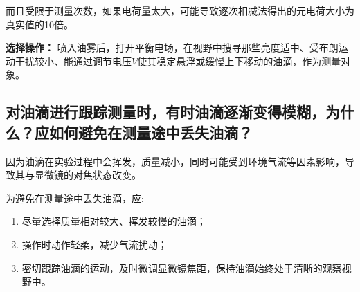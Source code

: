 \documentclass[yuxi]{../../templates/Report}%
\begin{document}
\begin{fullreportonly}
\begin{enumerate}
    而且受限于测量次数，如果电荷量太大，可能导致逐次相减法得出的元电荷大小为真实值的10倍。
\end{enumerate}
\textbf{选择操作：} 喷入油雾后，打开平衡电场，在视野中搜寻那些亮度适中、受布朗运动干扰较小、能通过调节电压$V$使其稳定悬浮或缓慢上下移动的油滴，作为测量对象。


\subsection{对油滴进行跟踪测量时，有时油滴逐渐变得模糊，为什么？应如何避免在测量途中丢失油滴？}
因为油滴在实验过程中会挥发，质量减小，同时可能受到环境气流等因素影响，导致其与显微镜的对焦状态改变。

\vspace{2mm}
为避免在测量途中丢失油滴，应:
\begin{enumerate}
    \item 尽量选择质量相对较大、挥发较慢的油滴；
    \item 操作时动作轻柔，减少气流扰动；
    \item 密切跟踪油滴的运动，及时微调显微镜焦距，保持油滴始终处于清晰的观察视野中。
\end{enumerate}
\end{fullreportonly}
\insertnotes
\end{document}
